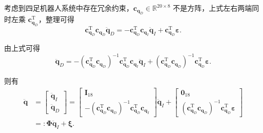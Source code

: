 考虑到四足机器人系统中存在冗余约束，$\boldsymbol{c}_{\boldsymbol{q}_D} \in \mathbb{R}^{20 \times 8}$ 不是方阵，上式左右两端同时左乘 $\boldsymbol{c}_{\boldsymbol{q}_D}^{\mathrm{T}}$，整理可得
\begin{equation}\label{eq:11.33}
\boldsymbol{c}_{\boldsymbol{q}_D}^{\mathrm{T}} \boldsymbol{c}_{\boldsymbol{q}_D} \ddot{\boldsymbol{q}}_D = -\boldsymbol{c}_{\boldsymbol{q}_D}^{\mathrm{T}} \boldsymbol{c}_{\boldsymbol{q}_I} \ddot{\boldsymbol{q}}_I + \boldsymbol{c}_{\boldsymbol{q}_D}^{\mathrm{T}} \boldsymbol{\varepsilon}.
\end{equation}

由上式可得
\begin{equation}\label{eq:11.34}
\ddot{\boldsymbol{q}}_D = - \left( \boldsymbol{c}_{\boldsymbol{q}_D}^{\mathrm{T}} \boldsymbol{c}_{\boldsymbol{q}_D} \right)^{-1} \boldsymbol{c}_{\boldsymbol{q}_D}^{\mathrm{T}} \boldsymbol{c}_{\boldsymbol{q}_I} \ddot{\boldsymbol{q}}_I + \left( \boldsymbol{c}_{\boldsymbol{q}_D}^{\mathrm{T}} \boldsymbol{c}_{\boldsymbol{q}_D} \right)^{-1} \boldsymbol{c}_{\boldsymbol{q}_D}^{\mathrm{T}} \boldsymbol{\varepsilon}.
\end{equation}

则有
\begin{equation}\label{eq:11.35}
\begin{aligned}
\ddot{\boldsymbol{q}} &= \begin{bmatrix}
\ddot{\boldsymbol{q}}_I \\[4pt]
\ddot{\boldsymbol{q}}_D
\end{bmatrix}
= \begin{bmatrix}
\boldsymbol{I}_{18} \\[4pt]
- \left( \boldsymbol{c}_{\boldsymbol{q}_D}^{\mathrm{T}} \boldsymbol{c}_{\boldsymbol{q}_D} \right)^{-1} \boldsymbol{c}_{\boldsymbol{q}_D}^{\mathrm{T}} \boldsymbol{c}_{\boldsymbol{q}_I}
\end{bmatrix} \ddot{\boldsymbol{q}}_I
+ \begin{bmatrix}
\boldsymbol{0}_{18} \\[4pt]
\left( \boldsymbol{c}_{\boldsymbol{q}_D}^{\mathrm{T}} \boldsymbol{c}_{\boldsymbol{q}_D} \right)^{-1} \boldsymbol{c}_{\boldsymbol{q}_D}^{\mathrm{T}} \boldsymbol{\varepsilon}
\end{bmatrix} \\
&=: \boldsymbol{\Phi} \ddot{\boldsymbol{q}}_I + \boldsymbol{\xi}.
\end{aligned}
\end{equation}

